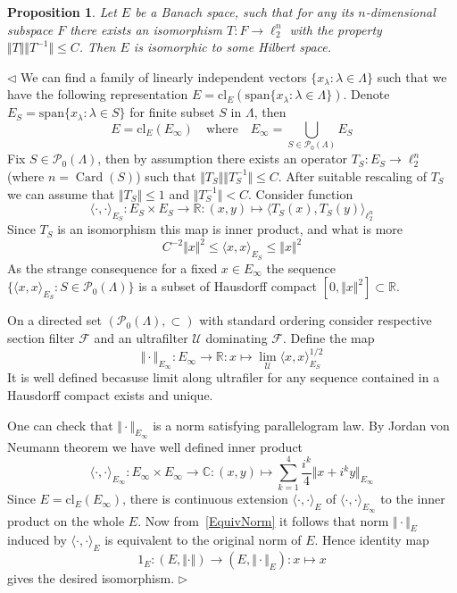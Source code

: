 \documentclass[12pt]{article}
\newtheorem{proposition}[theorem]{Proposition}
\newenvironment{proof}{\par $\triangleleft$}{$\triangleright$}
\begin{document}
\begin{proposition} Let $E$ be a Banach space, such that for any its
    $n$-dimensional subspace $F$ there exists an isomorphism $T:F\to \ell_2^n$
    with the property $\Vert T\Vert\Vert T^{-1}\Vert\leq C$. Then $E$ is
    isomorphic to some Hilbert space.
\end{proposition}
\begin{proof}
    We can find a family of linearly independent vectors
    $\{x_\lambda:\lambda\in\Lambda \}$  such that we have the following
    representation
    $E=\mathrm{cl}_E\left(\mathrm{span}\{x_\lambda:\lambda\in\Lambda \}\right)$.
    Denote $E_S=\mathrm{span}\{x_\lambda:\lambda\in S\}$ for finite subset $S$
    in $\Lambda$, then
    $$
        E=\mathrm{cl}_E(E_\infty)\quad\text{where}\quad
        E_\infty=\bigcup\limits_{S\in\mathcal{P}_0(\Lambda)} E_S
    $$
    Fix $S\in\mathcal{P}_0(\Lambda)$, then by assumption there exists an
    operator $T_S:E_S\to\ell_2^n$ (where $n=\operatorname{Card}(S)$) such that
    $\Vert T_S\Vert\Vert T_S^{-1}\Vert\leq C$. After suitable rescaling of $T_S$
    we can assume that $\Vert T_S\Vert\leq 1$ and $\Vert T_S^{-1}\Vert< C$.
    Consider function
    $$
        \langle\cdot, \cdot\rangle_{E_S}:
        E_S\times E_S\to\mathbb{R}:(x,y)\mapsto
        \langle T_S(x),T_S(y)\rangle_{\ell_2^n}
    $$
    Since $T_S$ is an isomorphism this map is inner product, and what is more
    \begin{equation}\label{EquivNorm}
        C^{-2}\Vert x\Vert^2\leq \langle x, x\rangle_{E_S}\leq\Vert x\Vert^2
    \end{equation}
    As the strange consequence for a fixed $x\in E_\infty$ the sequence
    $\{\langle x, x\rangle_{E_S}:S\in\mathcal{P}_0(\Lambda)\}$ is a subset of
    Hausdorff compact $[0, \Vert x\Vert^2]\subset\mathbb{R}$.

    On a directed set $(\mathcal{P}_0(\Lambda),\subset)$ with standard ordering
    consider respective section filter $\mathcal{F}$ and an ultrafilter
    $\mathcal{U}$ dominating $\mathcal{F}$. Define the map
    $$
        \Vert\cdot\Vert_{E_\infty} :E_\infty\to\mathbb{R}:
        x\mapsto\lim\limits_{\mathcal{U}}\langle x, x\rangle_{E_S}^{1/2}
    $$
    It is well defined becasuse limit along ultrafiler for any sequence
    contained in a Hausdorff compact exists and unique.

    One can check that $\Vert\cdot\Vert_{E_\infty}$ is a norm satisfying
    parallelogram law. By Jordan von Neumann theorem we have well defined inner
    product
    $$
        \langle\cdot,\cdot\rangle_{E_\infty}:E_\infty\times
        E_\infty\to\mathbb{C}:(x,y)\mapsto
        \sum\limits_{k=1}^4\frac{i^k}{4}\Vert x+i^k y\Vert_{E_\infty}
    $$
    Since $E=\mathrm{cl}_E(E_\infty)$, there is continuous extension
    $\langle\cdot,\cdot\rangle_E$ of $\langle\cdot,\cdot\rangle_{E_\infty}$ to
    the inner product on the whole $E$. Now from~\ref{EquivNorm} it follows that
    norm $\Vert\cdot\Vert_E$ induced by $\langle\cdot,\cdot\rangle_E$ is
    equivalent to the original norm of $E$. Hence identity map
    $$
        1_E:(E,\Vert\cdot\Vert)\to(E,\Vert\cdot\Vert_E):x\mapsto x
    $$
    gives the desired isomorphism.
\end{proof}
\end{document}
